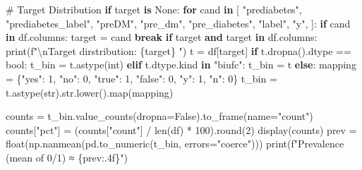 \documentclass[
  letterpaper,
  DIV=11,
  numbers=noendperiod]{scrartcl}
\newenvironment{Shaded}{\begin{snugshade}}{\end{snugshade}}
\newcommand{\BuiltInTok}[1]{\textcolor[rgb]{0.00,0.23,0.31}{#1}}
\newcommand{\CharTok}[1]{\textcolor[rgb]{0.13,0.47,0.30}{#1}}
\newcommand{\CommentTok}[1]{\textcolor[rgb]{0.37,0.37,0.37}{#1}}
\newcommand{\ControlFlowTok}[1]{\textcolor[rgb]{0.00,0.23,0.31}{\textbf{#1}}}
\newcommand{\DecValTok}[1]{\textcolor[rgb]{0.68,0.00,0.00}{#1}}
\newcommand{\KeywordTok}[1]{\textcolor[rgb]{0.00,0.23,0.31}{\textbf{#1}}}
\newcommand{\NormalTok}[1]{\textcolor[rgb]{0.00,0.23,0.31}{#1}}
\newcommand{\OperatorTok}[1]{\textcolor[rgb]{0.37,0.37,0.37}{#1}}
\newcommand{\SpecialCharTok}[1]{\textcolor[rgb]{0.37,0.37,0.37}{#1}}
\newcommand{\SpecialStringTok}[1]{\textcolor[rgb]{0.13,0.47,0.30}{#1}}
\newcommand{\StringTok}[1]{\textcolor[rgb]{0.13,0.47,0.30}{#1}}
\newcommand{\VariableTok}[1]{\textcolor[rgb]{0.07,0.07,0.07}{#1}}
\begin{document}
\begin{Shaded}
\begin{Highlighting}[]
    \CommentTok{\# Target Distribution}
\ControlFlowTok{if}\NormalTok{ target }\KeywordTok{is} \VariableTok{None}\NormalTok{:}
    \ControlFlowTok{for}\NormalTok{ cand }\KeywordTok{in}\NormalTok{ [}
        \StringTok{"prediabetes"}\NormalTok{,}
        \StringTok{"prediabetes\_label"}\NormalTok{,}
        \StringTok{"preDM"}\NormalTok{,}
        \StringTok{"pre\_dm"}\NormalTok{,}
        \StringTok{"pre\_diabetes"}\NormalTok{,}
        \StringTok{"label"}\NormalTok{,}
        \StringTok{"y"}\NormalTok{,}
\NormalTok{    ]:}
        \ControlFlowTok{if}\NormalTok{ cand }\KeywordTok{in}\NormalTok{ df.columns:}
\NormalTok{            target }\OperatorTok{=}\NormalTok{ cand}
            \ControlFlowTok{break}
\ControlFlowTok{if}\NormalTok{ target }\KeywordTok{and}\NormalTok{ target }\KeywordTok{in}\NormalTok{ df.columns:}
    \BuiltInTok{print}\NormalTok{(}\SpecialStringTok{f"}\CharTok{\textbackslash{}n}\SpecialStringTok{Target dirstribution: }\SpecialCharTok{\{}\NormalTok{target}\SpecialCharTok{\}}\SpecialStringTok{ "}\NormalTok{)}
\NormalTok{    t }\OperatorTok{=}\NormalTok{ df[target]}
    \ControlFlowTok{if}\NormalTok{ t.dropna().dtype }\OperatorTok{==} \BuiltInTok{bool}\NormalTok{:}
\NormalTok{        t\_bin }\OperatorTok{=}\NormalTok{ t.astype(}\BuiltInTok{int}\NormalTok{)}
    \ControlFlowTok{elif}\NormalTok{ t.dtype.kind }\KeywordTok{in} \StringTok{"biufc"}\NormalTok{:}
\NormalTok{        t\_bin }\OperatorTok{=}\NormalTok{ t}
    \ControlFlowTok{else}\NormalTok{:}
\NormalTok{        mapping }\OperatorTok{=}\NormalTok{ \{}\StringTok{"yes"}\NormalTok{: }\DecValTok{1}\NormalTok{, }\StringTok{"no"}\NormalTok{: }\DecValTok{0}\NormalTok{, }\StringTok{"true"}\NormalTok{: }\DecValTok{1}\NormalTok{, }\StringTok{"false"}\NormalTok{: }\DecValTok{0}\NormalTok{, }\StringTok{"y"}\NormalTok{: }\DecValTok{1}\NormalTok{, }\StringTok{"n"}\NormalTok{: }\DecValTok{0}\NormalTok{\}}
\NormalTok{        t\_bin }\OperatorTok{=}\NormalTok{ t.astype(}\BuiltInTok{str}\NormalTok{).}\BuiltInTok{str}\NormalTok{.lower().}\BuiltInTok{map}\NormalTok{(mapping)}

\NormalTok{    counts }\OperatorTok{=}\NormalTok{ t\_bin.value\_counts(dropna}\OperatorTok{=}\VariableTok{False}\NormalTok{).to\_frame(name}\OperatorTok{=}\StringTok{"count"}\NormalTok{)}
\NormalTok{    counts[}\StringTok{"pct"}\NormalTok{] }\OperatorTok{=}\NormalTok{ (counts[}\StringTok{"count"}\NormalTok{] }\OperatorTok{/} \BuiltInTok{len}\NormalTok{(df) }\OperatorTok{*} \DecValTok{100}\NormalTok{).}\BuiltInTok{round}\NormalTok{(}\DecValTok{2}\NormalTok{)}
\NormalTok{    display(counts)}
\NormalTok{    prev }\OperatorTok{=} \BuiltInTok{float}\NormalTok{(np.nanmean(pd.to\_numeric(t\_bin, errors}\OperatorTok{=}\StringTok{"coerce"}\NormalTok{)))}
    \BuiltInTok{print}\NormalTok{(}\SpecialStringTok{f"Prevalence (mean of 0/1) ≈ }\SpecialCharTok{\{}\NormalTok{prev}\SpecialCharTok{:.4f\}}\SpecialStringTok{"}\NormalTok{)}
\end{Highlighting}
\end{Shaded}
\end{document}
